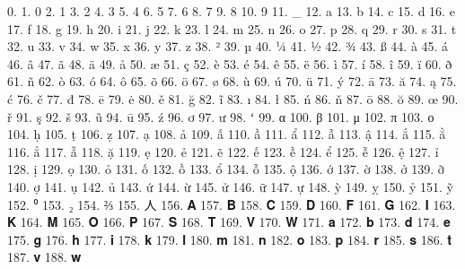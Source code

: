 0.  
1. 0
2. 1
3. 2
4. 3
5. 4
6. 5
7. 6
8. 7
9. 8
10. 9
11. _
12. a
13. b
14. c
15. d
16. e
17. f
18. g
19. h
20. i
21. j
22. k
23. l
24. m
25. n
26. o
27. p
28. q
29. r
30. s
31. t
32. u
33. v
34. w
35. x
36. y
37. z
38. ²
39. µ
40. ¼
41. ½
42. ¾
43. ß
44. à
45. á
46. â
47. ã
48. ä
49. å
50. æ
51. ç
52. è
53. é
54. ê
55. ë
56. ì
57. í
58. î
59. ï
60. ð
61. ñ
62. ò
63. ó
64. ô
65. õ
66. ö
67. ø
68. ù
69. ú
70. ü
71. ý
72. ā
73. ă
74. ą
75. ć
76. č
77. đ
78. ē
79. ė
80. ě
81. ğ
82. ĩ
83. ı
84. ł
85. ń
86. ň
87. ō
88. ŏ
89. œ
90. ř
91. ş
92. š
93. ũ
94. ū
95. ź
96. ơ
97. ư
98. ʻ
99. α
100. β
101. μ
102. π
103. о
104. ḥ
105. ṭ
106. ẓ
107. ạ
108. ả
109. ấ
110. ầ
111. ẩ
112. ẫ
113. ậ
114. ắ
115. ằ
116. ẳ
117. ẵ
118. ặ
119. ẹ
120. ẻ
121. ẽ
122. ế
123. ề
124. ể
125. ễ
126. ệ
127. ỉ
128. ị
129. ọ
130. ỏ
131. ố
132. ồ
133. ổ
134. ỗ
135. ộ
136. ớ
137. ờ
138. ở
139. ỡ
140. ợ
141. ụ
142. ủ
143. ứ
144. ừ
145. ử
146. ữ
147. ự
148. ỳ
149. ỵ
150. ỷ
151. ỹ
152. ⁰
153. ₂
154. ⅔
155. 人
156. 𝐀
157. 𝐁
158. 𝐂
159. 𝐃
160. 𝐅
161. 𝐆
162. 𝐈
163. 𝐊
164. 𝐌
165. 𝐎
166. 𝐏
167. 𝐒
168. 𝐓
169. 𝐕
170. 𝐖
171. 𝐚
172. 𝐛
173. 𝐝
174. 𝐞
175. 𝐠
176. 𝐡
177. 𝐢
178. 𝐤
179. 𝐥
180. 𝐦
181. 𝐧
182. 𝐨
183. 𝐩
184. 𝐫
185. 𝐬
186. 𝐭
187. 𝐯
188. 𝐰
